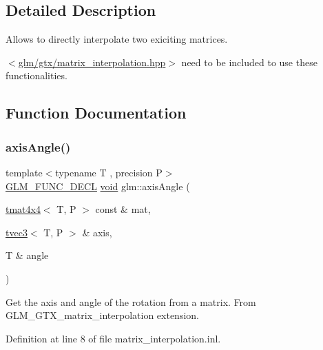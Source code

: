 \subsection{Detailed Description}
Allows to directly interpolate two exiciting matrices. 

$<$\mbox{\hyperlink{matrix__interpolation_8hpp}{glm/gtx/matrix\+\_\+interpolation.\+hpp}}$>$ need to be included to use these functionalities. 

\subsection{Function Documentation}
\mbox{\label{group__gtx__matrix__interpolation_ga9aef292eb5f29bdbb58a53ef4281af92}} 
\subsubsection{\texorpdfstring{axisAngle()}{axisAngle()}}
{\footnotesize\ttfamily template$<$typename T , precision P$>$ \\
\mbox{\hyperlink{setup_8hpp_ab2d052de21a70539923e9bcbf6e83a51}{G\+L\+M\+\_\+\+F\+U\+N\+C\+\_\+\+D\+E\+CL}} \mbox{\hyperlink{glad_8h_a950fc91edb4504f62f1c577bf4727c29}{void}} glm\+::axis\+Angle (\begin{DoxyParamCaption}\item[{\mbox{\hyperlink{structglm_1_1tmat4x4}{tmat4x4}}$<$ T, P $>$ const \&}]{mat,  }\item[{\mbox{\hyperlink{structglm_1_1tvec3}{tvec3}}$<$ T, P $>$ \&}]{axis,  }\item[{T \&}]{angle }\end{DoxyParamCaption})}

Get the axis and angle of the rotation from a matrix. From G\+L\+M\+\_\+\+G\+T\+X\+\_\+matrix\+\_\+interpolation extension. 

Definition at line 8 of file matrix\+\_\+interpolation.\+inl.

\mbox{\label{group__gtx__matrix__interpolation_ga82d4bc058e9628cb2ea1d4e117a0cf39}} 

